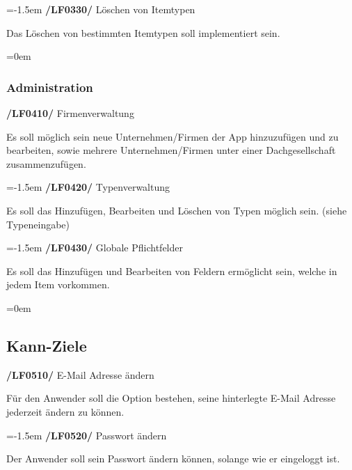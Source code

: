 \documentclass[11pt,a4paper]{report}
\begin{document}
\leftskip=-1.5em
\textbf{/LF0330/} Löschen von Itemtypen
\par
\begingroup
\leftskip=1cm
\noindent Das Löschen von bestimmten Itemtypen soll implementiert sein.\\
\par
\endgroup

\leftskip=0em
\subsubsection{Administration}

\textbf{/LF0410/} Firmenverwaltung
\par
\begingroup
\leftskip=1cm
\noindent Es soll möglich sein neue Unternehmen/Firmen der App hinzuzufügen und zu bearbeiten, sowie mehrere Unternehmen/Firmen unter einer Dachgesellschaft zusammenzufügen.\\
\par
\endgroup

\leftskip=-1.5em
\textbf{/LF0420/} Typenverwaltung
\par
\begingroup
\leftskip=1cm
\noindent Es soll das Hinzufügen, Bearbeiten und Löschen von Typen möglich sein. (siehe Typeneingabe)\\
\par
\endgroup

\leftskip=-1.5em
\textbf{/LF0430/} Globale Pflichtfelder
\par
\begingroup
\leftskip=1cm
\noindent Es soll das Hinzufügen und Bearbeiten von Feldern ermöglicht sein, welche in jedem Item vorkommen.\\
\par
\endgroup

\leftskip=0em
\subsection{Kann-Ziele}

\textbf{/LF0510/} E-Mail Adresse ändern
\par
\begingroup
\leftskip=1cm
\noindent Für den Anwender soll die Option bestehen, seine hinterlegte E-Mail Adresse jederzeit ändern zu können.\\
\par
\endgroup

\leftskip=-1.5em
\textbf{/LF0520/} Passwort ändern
\par
\begingroup
\leftskip=1cm
\noindent Der Anwender soll sein Passwort ändern können, solange wie er eingeloggt ist.\\
\par
\endgroup
\end{document}

